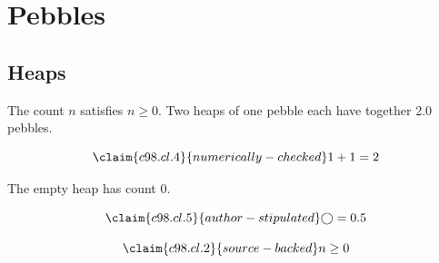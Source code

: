 \chapter{Pebbles}\label{c98}
\section{Heaps}\label{c98.s1}

\begin{theorem}[Count]\label{c98.thm.count}
  The count $n$ satisfies $n \geq 0$.
  Two heaps of one pebble each have together
  \num[c98.cl.4]{2.0}{} pebbles.
\end{theorem}

\begin{equation}\label{c98.eq.sum}\claim{c98.cl.4}{numerically-checked}
  1 + 1 = 2
\end{equation}

\begin{lemma}[Empty]\label{c98.lem.empty}
  The empty heap has count $0$.
\end{lemma}

\begin{equation}\label{c98.eq.circle}\claim{c98.cl.5}{author-stipulated}
  \bigcirc = 0.5
\end{equation}

\begin{vertiefung}[id=c98.v1, titel={T}, wozu={W}, voraussetzung={V}, zurueck={Z}]
  \begin{equation}\label{c98.eq.page}\claim{c98.cl.2}{source-backed}
    n \geq 0
  \end{equation}
\end{vertiefung}
